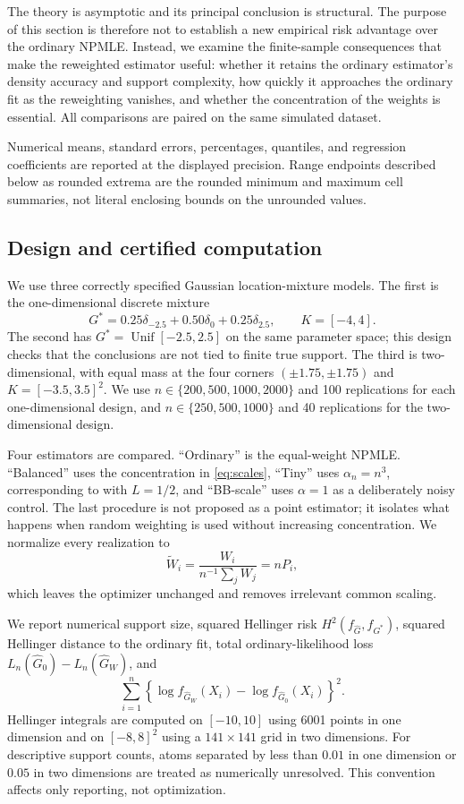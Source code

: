 \documentclass[11pt]{article}
\theoremstyle{definition}
\theoremstyle{remark}
\begin{document}
The theory is asymptotic and its principal conclusion is structural.  The
purpose of this section is therefore not to establish a new empirical risk
advantage over the ordinary NPMLE.  Instead, we examine the finite-sample
consequences that make the reweighted estimator useful: whether it retains the
ordinary estimator's density accuracy and support complexity, how quickly it
approaches the ordinary fit as the reweighting vanishes, and whether the
concentration of the weights is essential.  All comparisons are paired on the
same simulated dataset.

Numerical means, standard errors, percentages, quantiles, and regression
coefficients are reported at the displayed precision.  Range endpoints
described below as rounded extrema are the rounded minimum and maximum cell
summaries, not literal enclosing bounds on the unrounded values.

\subsection{Design and certified computation}

We use three correctly specified Gaussian location-mixture models.  The first
is the one-dimensional discrete mixture
\[
 G^*=0.25\delta_{-2.5}+0.50\delta_0+0.25\delta_{2.5},
 \qquad K=[-4,4].
\]
The second has $G^*=\operatorname{Unif}[-2.5,2.5]$ on the same parameter
space; this design checks that the conclusions are not tied to finite true
support.  The third is two-dimensional, with equal mass at the four corners
$(\pm1.75,\pm1.75)$ and $K=[-3.5,3.5]^2$.  We use
$n\in\{200,500,1000,2000\}$ and 100 replications for each one-dimensional
design, and $n\in\{250,500,1000\}$ and 40 replications for the
two-dimensional design.

Four estimators are compared.  ``Ordinary'' is the equal-weight NPMLE.
``Balanced'' uses the concentration in \eqref{eq:scales},
``Tiny'' uses $\alpha_n=n^3$, corresponding to  with
$L=1/2$, and ``BB-scale'' uses $\alpha=1$ as a deliberately noisy control.
The last procedure is not proposed as a point estimator; it isolates what
happens when random weighting is used without increasing concentration.  We
normalize every realization to
\[
 \widetilde W_i=\frac{W_i}{n^{-1}\sum_jW_j}=nP_i,
\]
which leaves the optimizer unchanged and removes irrelevant common scaling.

We report numerical support size, squared Hellinger risk
$H^2(f_{\widehat G},f_{G^*})$, squared Hellinger distance to the ordinary fit,
total ordinary-likelihood loss
$L_n(\widehat G_0)-L_n(\widehat G_W)$, and
\[
 \sum_{i=1}^n\left\{
 \log f_{\widehat G_W}(X_i)-\log f_{\widehat G_0}(X_i)
 \right\}^2.
\]
Hellinger integrals are computed on $[-10,10]$ using 6001 points in one
dimension and on $[-8,8]^2$ using a $141\times141$ grid in two dimensions.
For descriptive support counts, atoms separated by less than $0.01$ in one
dimension or $0.05$ in two dimensions are treated as numerically unresolved.
This convention affects only reporting, not optimization.
\end{document}
